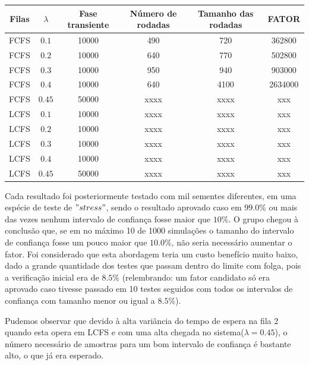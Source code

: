 \documentclass[a4paper,10pt]{article}
\begin{document}
\begin{center}
\begin{tabular} { | c | c | c | c | c | c | }
    \hline
    Filas & $\lambda$  & Fase transiente  & Número de rodadas & Tamanho das rodadas  & FATOR \\ \hline
    FCFS     & $0.1$   & 10000 & 490     & 720      & 362800       \\ \hline
    FCFS     & $0.2$   & 10000 & 640     & 770      & 502800       \\ \hline
    FCFS     & $0.3$   & 10000 & 950     & 940      & 903000       \\ \hline
    FCFS     & $0.4$   & 10000 & 640     & 4100    & 2634000     \\ \hline
    FCFS     & $0.45$ & 50000 & xxxx   & xxxx    & xxx             \\ \hline
    LCFS     & $0.1$   & 10000 & xxxx   & xxxx    & xxx             \\ \hline
    LCFS     & $0.2$   & 10000 & xxxx   & xxxx    & xxx             \\ \hline
    LCFS     & $0.3$   & 10000 & xxxx   & xxxx    & xxx             \\ \hline
    LCFS     & $0.4$   & 10000 & xxxx   & xxxx    & xxx             \\ \hline
    LCFS     & $0.45$ & 50000 & xxxx   & xxxx    & xxx             \\ \hline
\end{tabular}
\end{center}

Cada resultado foi  posteriormente testado com mil sementes diferentes, em uma espécie de teste de $"stress"$, sendo o resultado aprovado caso em $99.0\%$ ou mais das vezes nenhum intervalo de confiança fosse maior que $10\%$. O grupo chegou à conclusão que, se em no máximo 10 de 1000 simulações o tamanho do intervalo de confiança fosse um pouco maior que $10.0\%$, não seria necessário aumentar o fator. Foi considerado que esta abordagem teria um custo benefício muito baixo, dado a grande quantidade dos testes que passam dentro do limite com folga, pois a verificação inicial era de $8.5\%$ (relembrando: um fator candidato só era aprovado caso tivesse passado em 10 testes seguidos com todos os intervalos de confiança com tamanho menor ou igual a $8.5\%$).

Pudemos observar que devido à alta variância do tempo de espera na fila 2 quando esta opera em LCFS e com uma alta chegada no sistema($\lambda = 0.45$), o número necessário de amostras para um bom intervalo de confiança é bastante alto, o que já era esperado.
\end{document}
